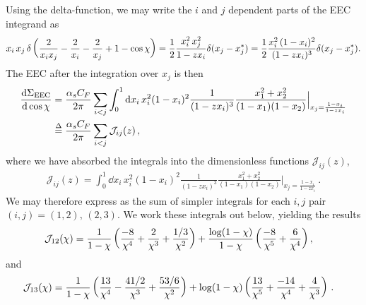 Using the delta-function, we may write the \(i\) and \(j\) dependent parts of the EEC integrand as
\begin{align}
    x_i\,x_j\,
    \delta\left(
        \frac{2}{x_i x_j} - \frac{2}{x_i} - \frac{2}{x_j} + 1
        -
        \cos\chi
    \right)
    =
    \frac{1}{2}
    \frac{x_i^2\,x_j^2}{1 - z x_i}
    \delta(x_j - x_j^*)
    =
    \frac{1}{2}
    \frac{x_i^2\,(1-x_i)^2}{(1 - z x_i)^3}
    \delta(x_j - x_j^*)
    .
\end{align}
%
The EEC after the integration over \(x_j\) is then
\begin{align}
    \dv{\Sigma_\text{EEC}}{\cos\chi}{}
    &=
    \frac{\alpha_s C_F}{2\pi}
    \sum_{i<j}
    \int_0^1 \dd x_i\,
    x_i^2 (1 - x_i)^2
    \frac{1}{(1- z x_i)^3}
    \frac{x_1^2 + x_2^2}{(1-x_1)(1-x_2)}
    \Big|_{x_j = \frac{1-x_i}{1-z x_i}}
    \\
    &
    \overset{\Delta}{=}
    \frac{\alpha_s C_F}{2\pi}
    \sum_{i<j}
    {\mathcal{J}}_{ij}(z)
    \,,
\end{align}
where we have absorbed the integrals into the dimensionless functions \(\mathcal{J}_{ij}(z)\),
\begin{align}
    {\mathcal{J}}_{ij}(z)
    =
    \int_0^1 \dd x_i\,
    x_i^2 (1 - x_i)^2
    \frac{1}{(1- z x_i)^3}
    \frac{x_1^2 + x_2^2}{(1-x_1)(1-x_2)}
    \Big|_{x_j = \frac{1-x_i}{1-z x_i}}
    \label{eq:eec_integrals}
    \,.
\end{align}
%
We may therefore express  as the sum of simpler integrals for each \(i, j\) pair \((i, j) = (1,2),\,(2,3)\).
%
We work these integrals out below, yielding the results
\begin{align}
    \mathcal{J}_{12}(\chi)
    &=
   \frac{1}{1-\chi}
   \left(
    \frac{-8}{\chi^4} + \frac{2}{\chi^3} + \frac{1/3}{\chi^2}
   \right)
   +
   \frac{\log(1-\chi)}{1-\chi}
   \left(
    \frac{-8}{\chi^5} + \frac{6}{\chi^4}
   \right)
    ,
\end{align}
and
\begin{align}
    \mathcal{J}_{13}(\chi)
    &=
    \frac{1}{1-\chi} \left(
        \frac{13}{\chi^4}
        -
        \frac{41/2}{\chi^3}
        +
        \frac{53/6}{\chi^2}
    \right)
    +
    \log(1-\chi)\left(
        \frac{13}{\chi^5}
        +
        \frac{-14}{\chi^4}
        +
        \frac{4}{\chi^3}
    \right)
    \,.
\end{align}

